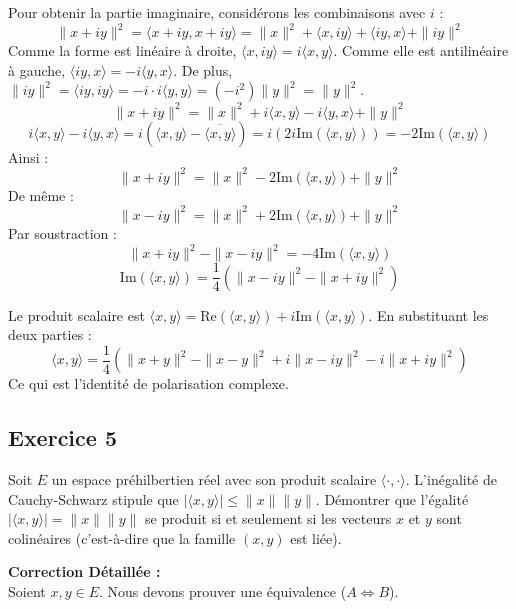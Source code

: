 \documentclass[11pt,a4paper]{report}
\begin{document}
Pour obtenir la partie imaginaire, considérons les combinaisons avec $i$ :
$$\|x + iy\|^2 = \langle x+iy, x+iy \rangle = \|x\|^2 + \langle x, iy \rangle + \langle iy, x \rangle + \|iy\|^2$$
Comme la forme est linéaire à droite, $\langle x, iy \rangle = i\langle x, y \rangle$.
Comme elle est antilinéaire à gauche, $\langle iy, x \rangle = -i\langle y, x \rangle$.
De plus, $\|iy\|^2 = \langle iy, iy \rangle = -i \cdot i \langle y, y \rangle = (-i^2) \|y\|^2 = \|y\|^2$.
$$\|x + iy\|^2 = \|x\|^2 + i\langle x, y \rangle - i\langle y, x \rangle + \|y\|^2$$
$$i\langle x, y \rangle - i\langle y, x \rangle = i(\langle x, y \rangle - \overline{\langle x, y \rangle}) = i(2i \text{Im}(\langle x, y \rangle)) = -2\text{Im}(\langle x, y \rangle)$$
Ainsi :
$$\|x + iy\|^2 = \|x\|^2 - 2\text{Im}(\langle x, y \rangle) + \|y\|^2$$
De même :
$$\|x - iy\|^2 = \|x\|^2 + 2\text{Im}(\langle x, y \rangle) + \|y\|^2$$
Par soustraction :
$$\|x + iy\|^2 - \|x - iy\|^2 = -4\text{Im}(\langle x, y \rangle)$$
$$\text{Im}(\langle x, y \rangle) = \frac{1}{4} (\|x - iy\|^2 - \|x + iy\|^2)$$

Le produit scalaire est $\langle x, y \rangle = \text{Re}(\langle x, y \rangle) + i\text{Im}(\langle x, y \rangle)$. En substituant les deux parties :
$$\langle x, y \rangle = \frac{1}{4} \left( \|x + y\|^2 - \|x - y\|^2 + i\|x - iy\|^2 - i\|x + iy\|^2 \right)$$
Ce qui est l'identité de polarisation complexe.

\subsection*{Exercice 5}

Soit $E$ un espace préhilbertien réel avec son produit scalaire $\langle \cdot, \cdot \rangle$.
L'inégalité de Cauchy-Schwarz stipule que $|\langle x, y \rangle| \le \|x\| \|y\|$.
Démontrer que l'égalité $|\langle x, y \rangle| = \|x\| \|y\|$ se produit si et seulement si les vecteurs $x$ et $y$ sont colinéaires (c'est-à-dire que la famille $(x, y)$ est liée).

\textbf{Correction Détaillée :}\\ Soient $x, y \in E$. Nous devons prouver une équivalence ($A \iff B$).
\end{document}
